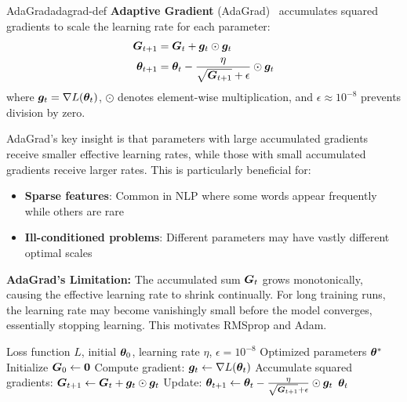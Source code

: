 \documentclass[../../main.tex]{subfiles}
\begin{document}
\begin{definition}{AdaGrad}{adagrad-def}
\textbf{Adaptive Gradient} (AdaGrad)~\cite{duchi2011adaptive} accumulates squared gradients to scale the learning rate for each parameter:
\begin{align}
    \boldsymbol{G}_{t+1} &= \boldsymbol{G}_t + \boldsymbol{g}_t \odot \boldsymbol{g}_t \\
    \boldsymbol{\theta}_{t+1} &= \boldsymbol{\theta}_t - \frac{\eta}{\sqrt{\boldsymbol{G}_{t+1}} + \epsilon} \odot \boldsymbol{g}_t
\end{align}
where $\boldsymbol{g}_t = \nabla L(\boldsymbol{\theta}_t)$, $\odot$ denotes element-wise multiplication, and $\epsilon \approx 10^{-8}$ prevents division by zero.
\end{definition}

AdaGrad's key insight is that parameters with large accumulated gradients receive smaller effective learning rates, while those with small accumulated gradients receive larger rates. This is particularly beneficial for:
\begin{itemize}
    \item \textbf{Sparse features}: Common in NLP where some words appear frequently while others are rare
    \item \textbf{Ill-conditioned problems}: Different parameters may have vastly different optimal scales
\end{itemize}

\begin{important}
\textbf{AdaGrad's Limitation:} The accumulated sum $\boldsymbol{G}_t$ grows monotonically, causing the effective learning rate to shrink continually. For long training runs, the learning rate may become vanishingly small before the model converges, essentially stopping learning. This motivates RMSprop and Adam.
\end{important}

\begin{algorithm}[htbp]
\caption{AdaGrad}
\label{alg:adagrad}
\begin{algorithmic}[1]
\Require Loss function $L$, initial $\boldsymbol{\theta}_0$, learning rate $\eta$, $\epsilon = 10^{-8}$
\Ensure Optimized parameters $\boldsymbol{\theta}^*$
\State Initialize $\boldsymbol{G}_0 \gets \mathbf{0}$
    \State Compute gradient: $\boldsymbol{g}_t \gets \nabla L(\boldsymbol{\theta}_t)$
    \State Accumulate squared gradients: $\boldsymbol{G}_{t+1} \gets \boldsymbol{G}_t + \boldsymbol{g}_t \odot \boldsymbol{g}_t$
    \State Update: $\boldsymbol{\theta}_{t+1} \gets \boldsymbol{\theta}_t - \frac{\eta}{\sqrt{\boldsymbol{G}_{t+1}} + \epsilon} \odot \boldsymbol{g}_t$
\EndFor
\State \Return $\boldsymbol{\theta}_t$
\end{algorithmic}
\end{algorithm}
\end{document}
